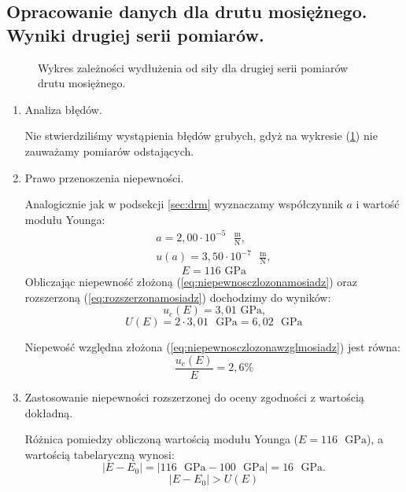 \documentclass [a4paper,11pt]{article}
\begin{document}
	\subsection{Opracowanie danych dla drutu mosiężnego. Wyniki drugiej serii pomiarów.}
	
	\begin{figure}[!h]
		\centering
		\caption{Wykres zależności wydłużenia od siły dla drugiej serii pomiarów drutu mosiężnego.}
		\label{fig:wykmosiadz2}
	\end{figure}
	
	\begin{enumerate}[label=\alph*)]
		\item Analiza błędów.
		
		Nie stwierdziliśmy wystąpienia błędów grubych, gdyż na wykresie (\ref{fig:wykmosiadz2}) nie zauważamy pomiarów odstających.
		
		\item Prawo przenoszenia niepewności.
		
		Analogicznie jak w podsekcji \ref{sec:drm} wyznaczamy współczynnik $a$ i wartość modułu Younga:
		\begin{align}
		a = 2,00 \cdot 10^{-5} \text{ }\mathrm{\frac{m}{N}},\label{a} \\
		u(a) = 3,50 \cdot 10^{-7} \text{ }\mathrm{\frac{m}{N}},
		\end{align}
		$$ E = 116 \text{ GPa} $$
		Obliczając niepewność złożoną (\ref{eq:niepewnosczlozonamosiadz}) oraz rozszerzoną (\ref{eq:rozszerzonamosiadz}) dochodzimy do wyników: 
		$$ u_c(E) = 3,01 \text{ GPa,} $$
		$$ U(E) = 2 \cdot 3,01 \text{ }\mathrm{GPa} = 6,02 \text{ }\mathrm{GPa} $$
		
		Niepewość względna złożona (\ref{eq:niepewnosczlozonawzglmosiadz}) jest równa:
		$$ \frac{u_c(E)}{E} = 2,6\% $$
		
		\item Zastosowanie niepewności rozszerzonej do oceny zgodności z wartością dokładną.
		
		Różnica pomiedzy obliczoną wartością modułu Younga ($E=116  \text{ }\mathrm{GPa}$), a wartością tabelaryczną wynosi:
		\begin{equation}
		\label{eq:roznicamosiadz2}
		|E - E_0| = \left|116 \text{ }\mathrm{GPa} - 100 \text{ }\mathrm{GPa}\right| = 16 \text{ }\mathrm{GPa}.
		\end{equation}
		$$
		|E - E_0| > U(E)
		$$
		
		
	\end{enumerate}
\end{document}
